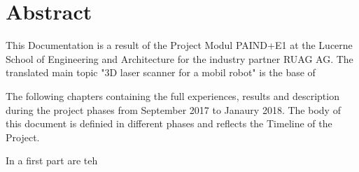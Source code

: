 \chapter*{Abstract}
This Documentation is a result of the Project Modul PAIND+E1 at the Lucerne School of Engineering and Architecture for the industry partner RUAG AG. The translated main topic "3D laser scanner for a mobil robot" is the base of

The following chapters containing the full experiences, results and description during the project phases from September 2017 to Janaury 2018. The body of this document is definied in different phases and reflects the Timeline of the Project.

In a first part are  teh